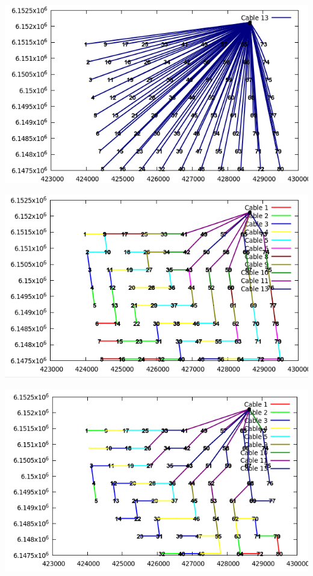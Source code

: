 \begin{center}
	\includegraphics[scale=0.4]{Graphics/data02-relax1.png}
	\label{img:relax1}
\end{center}

\begin{center}
	\includegraphics[scale=0.4]{Graphics/data02-relax2.png}
	\label{img:relax2}
\end{center}

\begin{center}
	\includegraphics[scale=0.4]{Graphics/data02-relax3.png}
	\label{img:relax3}
\end{center}
